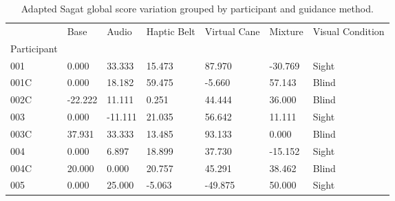 
\begin{table}[!htb]
\centering
\caption{Adapted Sagat global score variation grouped by participant and guidance method.}
\label{tab:sagat_var}
\begin{tabular}{lllllll}
\toprule
{} &    Base &   Audio &  Haptic Belt &  Virtual Cane &  Mixture & Visual Condition \\
Participant &         &         &              &               &          &                  \\
\midrule
001         &   0.000 &  33.333 &       15.473 &        87.970 &  -30.769 &            Sight \\
001C        &   0.000 &  18.182 &       59.475 &        -5.660 &   57.143 &            Blind \\
002C        & -22.222 &  11.111 &        0.251 &        44.444 &   36.000 &            Blind \\
003         &   0.000 & -11.111 &       21.035 &        56.642 &   11.111 &            Sight \\
003C        &  37.931 &  33.333 &       13.485 &        93.133 &    0.000 &            Blind \\
004         &   0.000 &   6.897 &       18.899 &        37.730 &  -15.152 &            Sight \\
004C        &  20.000 &   0.000 &       20.757 &        45.291 &   38.462 &            Blind \\
005         &   0.000 &  25.000 &       -5.063 &       -49.875 &   50.000 &            Sight \\
\bottomrule
\end{tabular}
\end{table}

